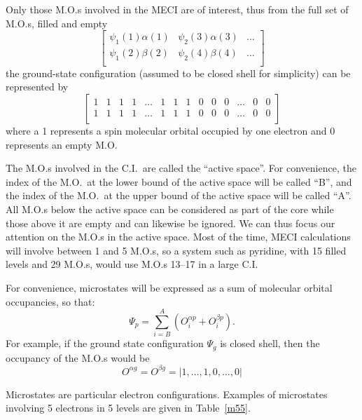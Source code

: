 Only those M.O.s involved in the MECI are of interest,
thus from the full set of M.O.s, filled and empty
$$
\left[
\begin{array}{lll}
\psi_1(1)\alpha(1)&\psi_2(3)\alpha(3)&\ldots\\
\psi_1(2)\beta(2)&\psi_2(4)\beta(4)&\ldots\\
\end{array}
\right]
$$
the ground-state configuration (assumed to be closed shell for simplicity) can
be represented by
$$
\left[
\begin{array}{llllllllllllll}
1&1&1&1&\ldots&1&1&1&0&0&0&\ldots&0&0\\
1&1&1&1&\ldots&1&1&1&0&0&0&\ldots&0&0\\
\end{array}
\right]
$$
where a 1 represents a spin molecular orbital occupied by one electron and 0
represents an empty M.O.

 The M.O.s involved in the C.I.\ are called the
``active space''. For convenience, the index of the M.O.\ at the lower bound of
the active space will be called ``B'', and the index of the M.O.\ at the upper
bound of the active space will be called ``A''. All M.O.s below the active
space can be considered as part of the core while those above it are empty and
can likewise be ignored. We can thus focus our attention on the M.O.s in the
active space. Most of the time, MECI calculations will  involve  between  1
and  5 M.O.s,  so  a system such as pyridine, with 15 filled levels and 29
M.O.s, would  use M.O.s 13--17 in a large C.I.

For convenience, microstates will be expressed as a sum of molecular orbital
occupancies, so that:
$$
\Psi_p=\sum_{i=B}^A(O_i^{\alpha p} + O_i^{\beta  p} ).
$$
For example, if the ground state configuration $\Psi_g$ is closed shell, then
the occupancy of the M.O.s would be
$$
O^{\alpha g} = O^{\beta  g} = |1,\ldots,1,0,\ldots,0|
$$

Microstates are particular electron configurations.  Examples of
microstates involving  5  electrons  in  5  levels are given in Table~\ref{m55}.

